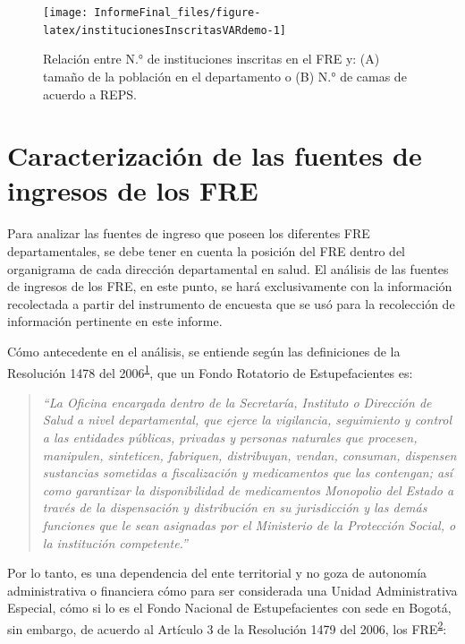 \documentclass[
]{book}
\begin{document}
\begin{figure}[b]

{\centering \texttt{[image: InformeFinal\_files/figure-latex/institucionesInscritasVARdemo-1]} 

}

\caption{Relación entre N.° de instituciones inscritas en el FRE y: (A) tamaño de la población en el departamento o (B) N.° de camas de acuerdo a REPS.}\label{fig:institucionesInscritasVARdemo}
\end{figure}

\hypertarget{caracterizaciuxf3n-de-las-fuentes-de-ingresos-de-los-fre}{%
\section{Caracterización de las fuentes de ingresos de los FRE}\label{caracterizaciuxf3n-de-las-fuentes-de-ingresos-de-los-fre}}

Para analizar las fuentes de ingreso que poseen los diferentes FRE departamentales, se debe tener en cuenta la posición del FRE dentro del organigrama de cada dirección departamental en salud. El análisis de las fuentes de ingresos de los FRE, en este punto, se hará exclusivamente con la información recolectada a partir del instrumento de encuesta que se usó para la recolección de información pertinente en este informe.

Cómo antecedente en el análisis, se entiende según las definiciones de la Resolución 1478 del 2006\textsuperscript{\protect\hyperlink{ref-MSPS1478-2006}{1}}, que un Fondo Rotatorio de Estupefacientes es:

\begin{quote}
\emph{``La Oficina encargada dentro de la Secretaría, Instituto o Dirección de Salud a nivel departamental, que ejerce la vigilancia, seguimiento y control a las entidades públicas, privadas y personas naturales que procesen, manipulen, sinteticen, fabriquen, distribuyan, vendan, consuman, dispensen sustancias sometidas a fiscalización y medicamentos que las contengan; así como garantizar la disponibilidad de medicamentos Monopolio del Estado a través de la dispensación y distribución en su jurisdicción y las demás funciones que le sean asignadas por el Ministerio de la Protección Social, o la institución competente.''}
\end{quote}

Por lo tanto, es una dependencia del ente territorial y no goza de autonomía administrativa o financiera cómo para ser considerada una Unidad Administrativa Especial, cómo si lo es el Fondo Nacional de Estupefacientes con sede en Bogotá, sin embargo, de acuerdo al Artículo 3 de la Resolución 1479 del 2006, los FRE\textsuperscript{\protect\hyperlink{ref-MSPS1479-2006}{2}}:
\end{document}
